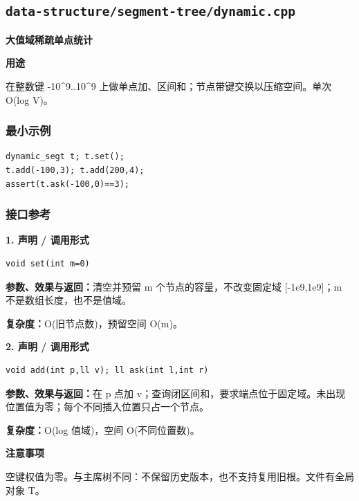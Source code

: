 \documentclass[UTF8,a4paper,10pt]{ctexart}
\newcommand{\TemplUsage}[1]{\textbf{用途}\par #1\par}
\newcommand{\TemplNote}[1]{\textbf{注意事项}\par #1\par}
\begin{document}
\subsection{\texttt{data-structure/segment-tree/dynamic.cpp}}
\textbf{大值域稀疏单点统计}\par
\TemplUsage{在整数键 -10\textasciicircum{}9..10\textasciicircum{}9 上做单点加、区间和；节点带键交换以压缩空间。单次 O(log V)。}
\subsubsection*{最小示例}
\begin{lstlisting}
dynamic_segt t; t.set();
t.add(-100,3); t.add(200,4);
assert(t.ask(-100,0)==3);
\end{lstlisting}
\subsubsection*{接口参考}
\noindent\begin{minipage}{\textwidth}
\textbf{1. 声明 / 调用形式}
\begin{lstlisting}
void set(int m=0)
\end{lstlisting}
\textbf{参数、效果与返回：}清空并预留 m 个节点的容量，不改变固定域 [-1e9,1e9]；m 不是数组长度，也不是值域。

\textbf{复杂度：}O(旧节点数)，预留空间 O(m)。

\end{minipage}\par\vspace{0.4em}
\noindent\begin{minipage}{\textwidth}
\textbf{2. 声明 / 调用形式}
\begin{lstlisting}
void add(int p,ll v); ll ask(int l,int r)
\end{lstlisting}
\textbf{参数、效果与返回：}在 p 点加 v；查询闭区间和，要求端点位于固定域。未出现位置值为零；每个不同插入位置只占一个节点。

\textbf{复杂度：}O(log 值域)，空间 O(不同位置数)。

\TemplNote{空键权值为零。与主席树不同：不保留历史版本，也不支持复用旧根。文件有全局对象 T。}
\end{minipage}\par\vspace{0.4em}
\end{document}
